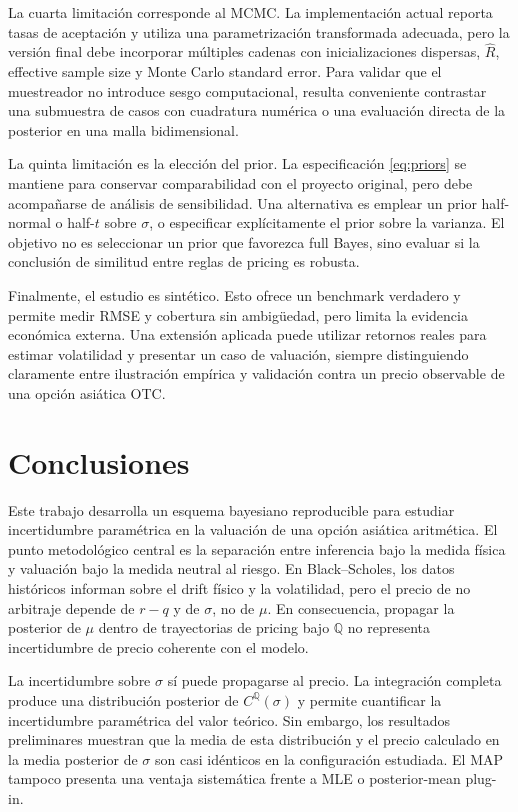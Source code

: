 \documentclass[12pt,letterpaper]{article}
\newcommand{\Qmeasure}{\mathbb{Q}}
\begin{document}
La cuarta limitación corresponde al MCMC. La implementación actual reporta tasas de aceptación y utiliza una parametrización transformada adecuada, pero la versión final debe incorporar múltiples cadenas con inicializaciones dispersas, $\widehat R$, effective sample size y Monte Carlo standard error. Para validar que el muestreador no introduce sesgo computacional, resulta conveniente contrastar una submuestra de casos con cuadratura numérica o una evaluación directa de la posterior en una malla bidimensional.

La quinta limitación es la elección del prior. La especificación \eqref{eq:priors} se mantiene para conservar comparabilidad con el proyecto original, pero debe acompañarse de análisis de sensibilidad. Una alternativa es emplear un prior half-normal o half-$t$ sobre $\sigma$, o especificar explícitamente el prior sobre la varianza. El objetivo no es seleccionar un prior que favorezca full Bayes, sino evaluar si la conclusión de similitud entre reglas de pricing es robusta.

Finalmente, el estudio es sintético. Esto ofrece un benchmark verdadero y permite medir RMSE y cobertura sin ambigüedad, pero limita la evidencia económica externa. Una extensión aplicada puede utilizar retornos reales para estimar volatilidad y presentar un caso de valuación, siempre distinguiendo claramente entre ilustración empírica y validación contra un precio observable de una opción asiática OTC.

\section{Conclusiones}

Este trabajo desarrolla un esquema bayesiano reproducible para estudiar incertidumbre paramétrica en la valuación de una opción asiática aritmética. El punto metodológico central es la separación entre inferencia bajo la medida física y valuación bajo la medida neutral al riesgo. En Black--Scholes, los datos históricos informan sobre el drift físico y la volatilidad, pero el precio de no arbitraje depende de $r-q$ y de $\sigma$, no de $\mu$. En consecuencia, propagar la posterior de $\mu$ dentro de trayectorias de pricing bajo $\Qmeasure$ no representa incertidumbre de precio coherente con el modelo.

La incertidumbre sobre $\sigma$ sí puede propagarse al precio. La integración completa produce una distribución posterior de $C^{\Qmeasure}(\sigma)$ y permite cuantificar la incertidumbre paramétrica del valor teórico. Sin embargo, los resultados preliminares muestran que la media de esta distribución y el precio calculado en la media posterior de $\sigma$ son casi idénticos en la configuración estudiada. El MAP tampoco presenta una ventaja sistemática frente a MLE o posterior-mean plug-in.
\end{document}
